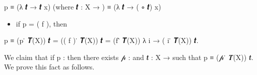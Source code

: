  \ab p \ad ≡  (\as λ \ab 𝒕 \as → \ab 𝒕 \ab x) (where \ab 𝒕 \as : \ab X \as → ) \ad ≡ (\as λ \ab 𝒕 \as → ( \af ∘ \ab 𝒕) \ab x)

\begin{itemize}
\item if \ab p \as = ( \ab f ), then
\end{itemize}

 \ab p \ad ≡  (\ab p \af ̇ \af 𝑻(\ab X)) \ab 𝒕 \as = (( \ab f ) \af ̇ \af 𝑻(\ab X)) \ab 𝒕 \as = (\ab f \af ̂ \af 𝑻(\ab X)) \as λ \ab i \as → ( \ab i \af ̇ \af 𝑻(\ab X)) \ab 𝒕.

We claim that if \ab p \as :  then there exists \ab 𝓅 \as :  and \ab 𝒕 \as : \ab X \as →  such that \ab p \ad ≡ (\ab 𝓅 \af ̇ \af 𝑻(\ab X)) \ab 𝒕. We prove this fact as follows.
\ccpad
